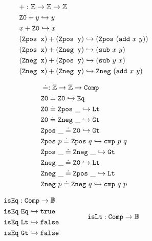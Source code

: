 \begin{figure}[tb]
\centering
\begin{minipage}[t]{0.48\textwidth}
\begin{align*}
&+: \mathbb{Z} \rightarrow \mathbb{Z} \rightarrow \mathbb{Z} \\
& \texttt{Z0} + y \hookrightarrow y \\
& x + \texttt{Z0} \hookrightarrow x \\
& (\texttt{Zpos x}) + (\texttt{Zpos y}) \hookrightarrow (\texttt{Zpos}~(\texttt{add}~x~y))  \\
& (\texttt{Zpos x}) + (\texttt{Zneg y}) \hookrightarrow (\texttt{sub}~x~y)  \\
& (\texttt{Zneg x}) + (\texttt{Zpos y}) \hookrightarrow (\texttt{sub}~y~x)  \\
& (\texttt{Zneg x}) + (\texttt{Zneg y}) \hookrightarrow \texttt{Zneg}~(\texttt{add}~x~y)
\end{align*}
\hfill
\end{minipage}
\begin{minipage}[t]{0.48\textwidth}
\begin{align*}
&\doteq : \mathbb{Z} \rightarrow \mathbb{Z} \rightarrow \texttt{Comp} \\
& \texttt{Z0} \doteq \texttt{Z0} \hookrightarrow \texttt{Eq} \\
& \texttt{Z0} \doteq \texttt{Zpos}~\_ \hookrightarrow \texttt{Lt} \\
& \texttt{Z0} \doteq \texttt{Zneg}~\_ \hookrightarrow \texttt{Gt} \\
& \texttt{Zpos}~\_ \doteq \texttt{Z0} \hookrightarrow \texttt{Gt} \\
& \texttt{Zpos}~p \doteq \texttt{Zpos}~q \hookrightarrow \texttt{cmp}~p~q \\
& \texttt{Zpos}~\_ \doteq \texttt{Zneg}~\_ \hookrightarrow \texttt{Gt} \\
& \texttt{Zneg}~\_ \doteq \texttt{Z0} \hookrightarrow \texttt{Lt} \\
& \texttt{Zneg}~\_ \doteq \texttt{Zpos}~\_ \hookrightarrow \texttt{Lt} \\
& \texttt{Zneg}~p \doteq \texttt{Zneg}~q \hookrightarrow \texttt{cmp}~q~p
\end{align*}
\end{minipage}
\noindent
\[
\begin{array}{l@{\hspace{4em}}l@{\hspace{4em}}l}
\begin{aligned}
  &\tt{isEq} : \tt{Comp} \ra \bb{B} \\
  &\tt{isEq}~\tt{Eq} \re \tt{true} \\
  &\tt{isEq}~\tt{Lt} \re \tt{false} \\
  &\tt{isEq}~\tt{Gt} \re \tt{false} 
\end{aligned}
&
\begin{aligned}
  &\tt{isLt} : \tt{Comp} \ra \bb{B} \\

\end{aligned}
\end{array}\]
\end{figure}
